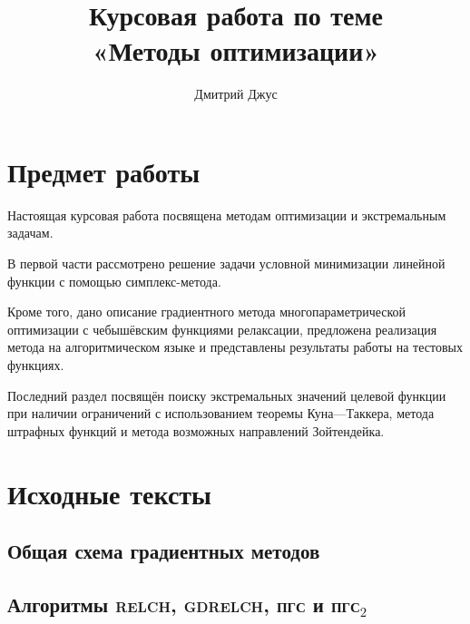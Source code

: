 \documentclass{article}
\newcommand{\relch}{\textsc{relch}}
\newcommand{\gdrelch}{\textsc{gdrelch}}
\newcommand{\gd}{\textsc{пгс}}
\newcommand{\rgd}{\textsc{пгс}$_2$}
\theoremstyle{ruthm}
\numberwithin{thm}{section}
\theoremstyle{rurem}
\theoremstyle{rudfn}
\numberwithin{equation}{section}
\begin{document}
\author{Дмитрий Джус}
\title{Курсовая работа по теме \\
  \Huge{«Методы оптимизации»}}
\pretitle{\begin{center}\LARGE}
\posttitle{\par\end{center}\vskip 3pc}
\date{}
\maketitle
\thispagestyle{empty}
\clearpage
\tableofcontents
\listoffigures

\clearpage
\section{Предмет работы}

Настоящая курсовая работа посвящена методам оптимизации и
экстремальным задачам.

В первой части рассмотрено решение задачи условной минимизации
линейной функции с помощью симплекс-метода.

Кроме того, дано описание градиентного метода многопараметрической
оптимизации с чебышёвским функциями релаксации, предложена реализация
метода на алгоритмическом языке и представлены результаты работы на
тестовых функциях.

Последний раздел посвящён поиску экстремальных значений целевой
функции при наличии ограничений с использованием теоремы Куна—Таккера,
метода штрафных функций и метода возможных направлений Зойтендейка.
\pagestyle{fancy}

\clearpage


\clearpage


\clearpage


\clearpage


\clearpage
\appendix
\section{Исходные тексты}
\label{sec:sources}

\subsection{Общая схема градиентных методов}


\subsection{Алгоритмы \relch{}, \gdrelch{}, \gd{} и \rgd{}}

\end{document}
